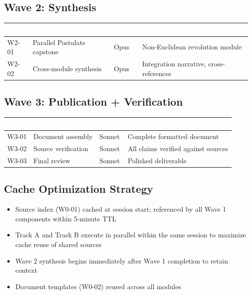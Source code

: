 \documentclass[11pt,letterpaper]{article}
\newcommand{\tableheader}[1]{\textbf{\sffamily\textcolor{white}{#1}}}
\begin{document}
\subsection{Wave 2: Synthesis}

\begin{center}
\begin{tabularx}{\textwidth}{C{1.2cm}L{3.5cm}C{1.5cm}X}
\toprule
{}
\tableheader{ID} & \tableheader{Task} & \tableheader{Model} & \tableheader{Output} \\
\midrule
W2-01 & Parallel Postulate capstone & Opus & Non-Euclidean revolution module \\
W2-02 & Cross-module synthesis & Opus & Integration narrative, cross-references \\
\bottomrule
\end{tabularx}
\end{center}

\subsection{Wave 3: Publication + Verification}

\begin{center}
\begin{tabularx}{\textwidth}{C{1.2cm}L{3.5cm}C{1.5cm}X}
\toprule
{}
\tableheader{ID} & \tableheader{Task} & \tableheader{Model} & \tableheader{Output} \\
\midrule
W3-01 & Document assembly & Sonnet & Complete formatted document \\
W3-02 & Source verification & Sonnet & All claims verified against sources \\
W3-03 & Final review & Sonnet & Polished deliverable \\
\bottomrule
\end{tabularx}
\end{center}

\subsection{Cache Optimization Strategy}

\begin{itemize}[leftmargin=2em]
  \item Source index (W0-01) cached at session start; referenced by all Wave 1 components within 5-minute TTL
  \item Track A and Track B execute in parallel within the same session to maximize cache reuse of shared sources
  \item Wave 2 synthesis begins immediately after Wave 1 completion to retain context
  \item Document templates (W0-02) reused across all modules
\end{itemize}
\end{document}

